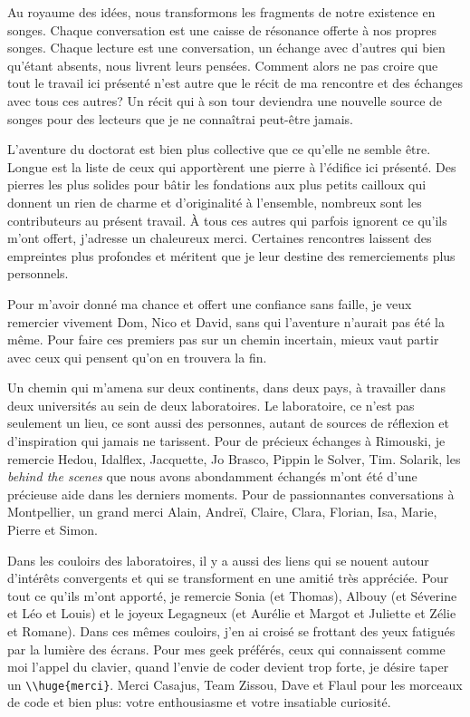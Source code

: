 Au royaume des idées, nous transformons les fragments de notre existence
en songes. Chaque conversation est une caisse de résonance offerte à nos
propres songes. Chaque lecture est une conversation, un échange avec
d'autres qui bien qu'étant absents, nous livrent leurs pensées. Comment
alors ne pas croire que tout le travail ici présenté n'est autre que le
récit de ma rencontre et des échanges avec tous ces autres? Un récit qui
à son tour deviendra une nouvelle source de songes pour des lecteurs que
je ne connaîtrai peut-être jamais.

L'aventure du doctorat est bien plus collective que ce qu'elle ne semble
être. Longue est la liste de ceux qui apportèrent une pierre à l'édifice
ici présenté. Des pierres les plus solides pour bâtir les fondations aux
plus petits cailloux qui donnent un rien de charme et d'originalité à
l'ensemble, nombreux sont les contributeurs au présent travail. À tous
ces autres qui parfois ignorent ce qu'ils m'ont offert, j'adresse un
chaleureux merci. Certaines rencontres laissent des empreintes plus
profondes et méritent que je leur destine des remerciements plus
personnels.

Pour m'avoir donné ma chance et offert une confiance sans faille, je
veux remercier vivement Dom, Nico et David, sans qui l'aventure n'aurait
pas été la même. Pour faire ces premiers pas sur un chemin incertain,
mieux vaut partir avec ceux qui pensent qu'on en trouvera la fin.

Un chemin qui m'amena sur deux continents, dans deux pays, à travailler
dans deux universités au sein de deux laboratoires. Le laboratoire, ce
n'est pas seulement un lieu, ce sont aussi des personnes, autant de
sources de réflexion et d'inspiration qui jamais ne tarissent. Pour de
précieux échanges à Rimouski, je remercie Hedou, Idalflex, Jacquette, Jo
Brasco, Pippin le Solver, Tim. Solarik, les \emph{behind the scenes} que
nous avons abondamment échangés m'ont été d'une précieuse aide dans les
derniers moments. Pour de passionnantes conversations à Montpellier, un
grand merci Alain, Andreï, Claire, Clara, Florian, Isa, Marie, Pierre et
Simon.

Dans les couloirs des laboratoires, il y a aussi des liens qui se nouent
autour d'intérêts convergents et qui se transforment en une amitié très
appréciée. Pour tout ce qu'ils m'ont apporté, je remercie Sonia (et
Thomas), Albouy (et Séverine et Léo et Louis) et le joyeux Legagneux (et
Aurélie et Margot et Juliette et Zélie et Romane). Dans ces mêmes
couloirs, j'en ai croisé se frottant des yeux fatigués par la lumière
des écrans. Pour mes geek préférés, ceux qui connaissent comme moi
l'appel du clavier, quand l'envie de coder devient trop forte, je désire
taper un \texttt{\textbackslash{}\textbackslash{}huge\{merci\}}. Merci
Casajus, Team Zissou, Dave et Flaul pour les morceaux de code et bien
plus: votre enthousiasme et votre insatiable curiosité.

